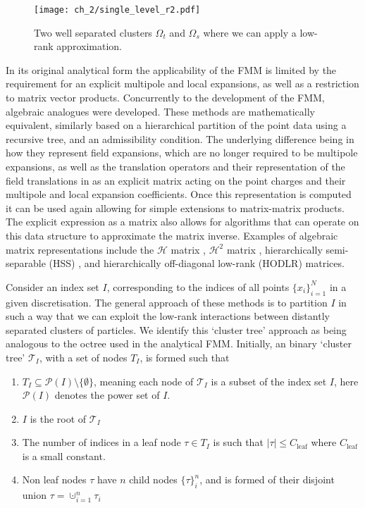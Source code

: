 \begin{figure}
    \centering
    \texttt{[image: ch\_2/single\_level\_r2.pdf]}
    \caption{Two well separated clusters $\Omega_t$ and $\Omega_s$ where we can apply a low-rank approximation.}
    \label{fig:ch_2:single_level_r2}
\end{figure}

In its original analytical form the applicability of the FMM is limited by the requirement for an explicit multipole and local expansions, as well as a restriction to matrix vector products. Concurrently to the development of the FMM, algebraic analogues were developed. These methods are mathematically equivalent, similarly based on a hierarchical partition of the point data using a recursive tree, and an admissibility condition. The underlying difference being in how they represent field expansions, which are no longer required to be multipole expansions, as well as the translation operators and their representation of the field translations in as an explicit matrix acting on the point charges and their multipole and local expansion coefficients. Once this representation is computed it can be used again allowing for simple extensions to matrix-matrix products. The explicit expression as a matrix also allows for algorithms that can operate on this data structure to approximate the matrix inverse. Examples of algebraic matrix representations include the $\mathcal{H}$ matrix \cite{hackbusch1999sparse}, $\mathcal{H}^2$ matrix \cite{borm2003short}, hierarchically semi-separable (HSS) \cite{chandrasekaran2007fast}, and hierarchically off-diagonal low-rank (HODLR) \cite{ambikasaran2013mathcal} matrices. 

Consider an index set $I$, corresponding to the indices of all points $\{ x_i \}_{i=1}^N$ in a given discretisation. The general approach of these methods is to partition $I$ in such a way that we can exploit the low-rank interactions between distantly separated clusters of particles. We identify this `cluster tree' approach as being analogous to the octree used in the analytical FMM. Initially, an binary `cluster tree' $\mathcal{T}_I$, with a set of nodes $T_I$, is formed such that

\begin{enumerate}
    \item $T_I \subseteq \mathcal{P}(I) \setminus \{ \emptyset \}$, meaning each node  of $\mathcal{T}_I$ is a subset of the index set $I$, here $\mathcal{P}(I)$ denotes the power set of $I$.
    \item $I$ is the root of $\mathcal{T}_I$
    \item The number of indices in a leaf node $\tau \in T_I$ is such that $|\tau| \leq C_{\text{leaf}}$ where $C_{\text{leaf}}$ is a small constant.
    \item Non leaf nodes $\tau$ have $n$ child nodes $\{ \tau \}_i^n$, and is formed of their disjoint union $\tau = \cupdot_{i=1}^n \tau_i$ 
\end{enumerate}

